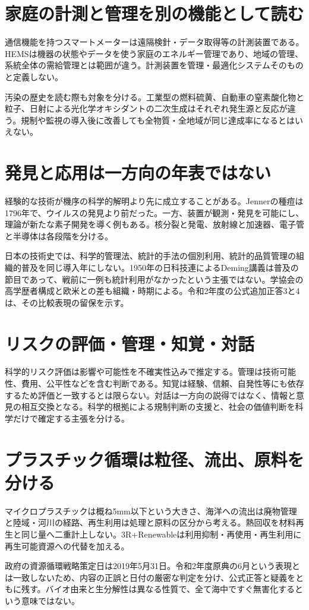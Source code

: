 \section{家庭の計測と管理を別の機能として読む}
\label{theory:env:smart}
\label{theory:env:airhistory}
通信機能を持つスマートメーターは遠隔検針・データ取得等の計測装置である。HEMSは機器の状態やデータを使う家庭のエネルギー管理であり、地域の管理、系統全体の需給管理とは範囲が違う。計測装置を管理・最適化システムそのものと定義しない。\cite{env59_smart}

汚染の歴史を読む際も対象を分ける。工業型の燃料硫黄、自動車の窒素酸化物と粒子、日射による光化学オキシダントの二次生成はそれぞれ発生源と反応が違う。規制や監視の導入後に改善しても全物質・全地域が同じ達成率になるとはいえない。

\section{発見と応用は一方向の年表ではない}
\label{theory:env:historydiscover}
\label{theory:env:technologysequence}
\label{theory:env:japanindustrial}
経験的な技術が機序の科学的解明より先に成立することがある。Jennerの種痘は1796年で、ウイルスの発見より前だった。一方、装置が観測・発見を可能にし、理論が新たな素子開発を導く例もある。核分裂と発電、放射線と加速器、電子管と半導体は各段階を分ける。\cite{env59_jenner,env59_lawrence}

日本の技術史では、科学的管理法、統計的手法の個別利用、統計的品質管理の組織的普及を同じ導入年にしない。1950年の日科技連によるDeming講義は普及の節目であって、戦前に一例も統計利用がなかったという主張ではない。学協会の高学歴者構成と欧米との差も組織・時期による。令和2年度の公式追加正答3と4は、その比較表現の留保を示す。\cite{env59_juse}

\section{リスクの評価・管理・知覚・対話}
\label{theory:env:risk}
科学的リスク評価は影響や可能性を不確実性込みで推定する。管理は技術可能性、費用、公平性などを含む判断である。知覚は経験、信頼、自発性等にも依存するため評価と一致するとは限らない。対話は一方向の説得ではなく、情報と意見の相互交換となる。科学的根拠による規制判断の支援と、社会の価値判断を科学だけで確定する主張を分ける。\cite{eth54_riskcomm}

\section{プラスチック循環は粒径、流出、原料を分ける}
\label{theory:env:plastics}
マイクロプラスチックは概ね5mm以下という大きさ、海洋への流出は廃物管理と陸域・河川の経路、再生利用は処理と原料の区分から考える。熱回収を材料再生と同じ量へ二重計上しない。3R+Renewableは利用抑制・再使用・再生利用に再生可能資源への代替を加える。

政府の資源循環戦略策定日は2019年5月31日。令和2年度原典の6月という表現とは一致しないため、内容の正誤と日付の厳密な判定を分け、公式正答と疑義をともに残す。バイオ由来と生分解性は異なる性質で、全て海中ですぐ無害化するという意味ではない。\cite{env59_plastic}
